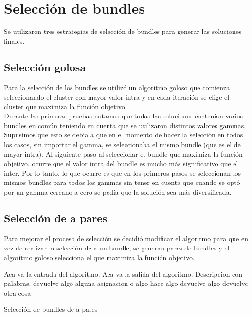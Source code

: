 \section{Selección de bundles}
Se utilizaron tres estrategias de selección de bundles para generar las soluciones finales.
\subsection{Selección golosa}
Para la selección de los bundles se utilizó un algoritmo goloso que comienza seleccionando el 
cluster con mayor valor intra y en cada iteración se elige el cluster que maximiza la función 
objetivo.\\
Durante las primeras pruebas notamos que todas las soluciones contenían varios bundles en común 
teniendo en cuenta que se utilizaron distintos valores gammas. Supusimos que esto se debía a que en 
el momento de hacer la selección en todos los casos, sin importar el gamma, se seleccionaba el mismo 
bundle (que es el de mayor intra). Al siguiente paso al seleccionar el bundle que maximiza la 
función objetivo, ocurre que el valor intra del bundle es mucho más significativo que el inter. Por 
lo tanto, lo que ocurre es que en los primeros pasos se seleccionan los mismos bundles para todos 
los gammas sin tener en cuenta que cuando se optó por un gamma cercano a cero se pedía que la 
solución sea más diversificada.\\
\subsection{Selección de a pares}
Para mejorar el proceso de selección se decidió modificar el algoritmo para que en vez de realizar 
la selección de a un bundle, se generan pares de bundles y el algoritmo goloso selecciona el que 
maximiza la función objetivo.
\begin{algorithm}
\begin{algorithmic}[1]
\REQUIRE Aca va la entrada del algoritmo.
\ENSURE Aca va la salida del algoritmo.
\STATE Descripcion con palabras.
 \label{lin:marcacionLinea}
\RETURN devuelve algo
\ELSE
\STATE alguna asignacion o algo
\ENDIF
\ENDWHILE
{}
\STATE hace algo
\RETURN devuelve algo
\ENDIF
\ENDFOR
\RETURN devuelve otra cosa
\end{algorithmic}
\caption{Selección de bundles de a pares}\label{alg:algSelTuple}
\end{algorithm}
